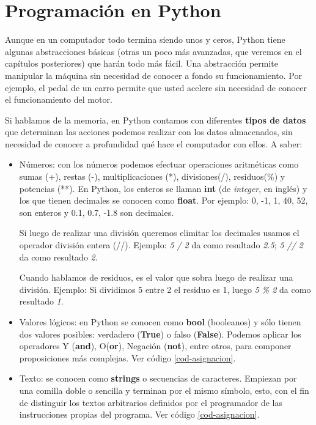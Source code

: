 \section{Programación en Python}

Aunque en un computador todo termina siendo unos y ceros, Python tiene algunas abstracciones básicas (otras un poco más avanzadas, que veremos en el capítulos posteriores) que harán todo más fácil. Una abstracción permite manipular la máquina sin necesidad de conocer a fondo su funcionamiento. Por ejemplo, el pedal de un carro permite que usted acelere sin necesidad de conocer el funcionamiento del motor. 

Si hablamos de la memoria, en Python contamos con diferentes \textbf{tipos de datos} que determinan las acciones podemos realizar con los datos almacenados, sin necesidad de conocer a profundidad qué hace el computador con ellos. A saber:

\begin{itemize}
\item Números: con los números podemos efectuar operaciones aritméticas como sumas (+), restas (-), multiplicaciones (*), divisiones(/), residuos(\%) y potencias (**). En Python, los enteros se llaman \textbf{int} (de \emph{integer}, en inglés) y los que tienen decimales se conocen como \textbf{float}. Por ejemplo: 0, -1, 1, 40, 52, son enteros y 0.1, 0.7, -1.8 son decimales. 

Si luego de realizar una división queremos elimitar los decimales usamos el operador división entera (//). Ejemplo: \emph{5 / 2} da como resultado \emph{2.5}; \emph{5 // 2} da como resultado \emph{2}.

Cuando hablamos de residuos, es el valor que sobra luego de realizar una división. Ejemplo: Si dividimos 5 entre 2 el residuo es 1, luego \emph{5 \% 2} da como resultado \emph{1}.

\item Valores lógicos: en Python se conocen como \textbf{bool} (booleanos) y sólo tienen dos valores posibles: verdadero (\textbf{True}) o falso (\textbf{False}). Podemos aplicar los operadores Y (\textbf{and}), O(\textbf{or}), Negación (\textbf{not}), entre otros, para componer proposiciones más complejas.  Ver código \ref{cod-asignacion}.

\item Texto: se conocen como \textbf{strings} o secuencias de caracteres. Empiezan por una comilla doble o sencilla y terminan por el mismo símbolo, esto, con el fin de distinguir los textos arbitrarios definidos por el programador de las instrucciones propias del programa. Ver código \ref{cod-asignacion}.
\end{itemize}

